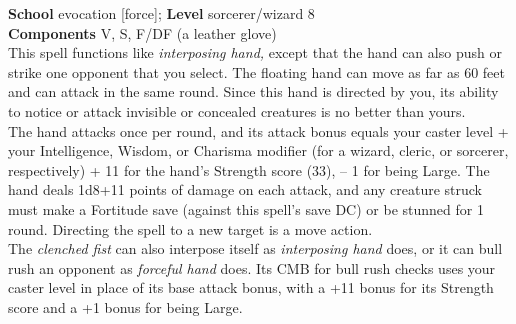 \textbf{School} evocation [force]; \textbf{Level} sorcerer/wizard 8\\
\textbf{Components} V, S, F/DF (a leather glove)\\
This spell functions like \textit{interposing hand, }except that the hand can also push or strike one opponent that you select. The floating hand can move as far as 60 feet and can attack in the same round. Since this hand is directed by you, its ability to notice or attack invisible or concealed creatures is no better than yours.\\
The hand attacks once per round, and its attack bonus equals your caster level + your Intelligence, Wisdom, or Charisma modifier (for a wizard, cleric, or sorcerer, respectively) + 11 for the hand's Strength score (33), -- 1 for being Large. The hand deals 1d8+11 points of damage on each attack, and any creature struck must make a Fortitude save (against this spell's save DC) or be stunned for 1 round. Directing the spell to a new target is a move action.\\
The \textit{clenched fist }can also interpose itself as \textit{interposing hand }does, or it can bull rush an opponent as \textit{forceful hand }does. Its CMB for bull rush checks uses your caster level in place of its base attack bonus, with a +11 bonus for its Strength score and a +1 bonus for being Large.\\
